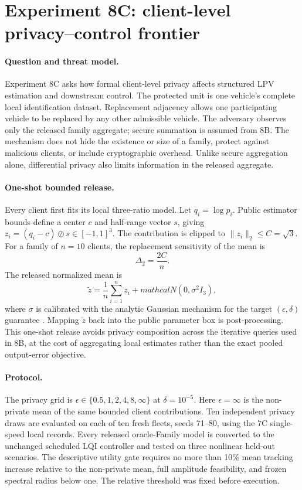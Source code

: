 \section{Experiment 8C: client-level privacy--control frontier}
\label{sec:experiment8c}

\paragraph{Question and threat model.}
Experiment 8C asks how formal client-level privacy affects structured LPV
estimation and downstream control. The protected unit is one vehicle's complete
local identification dataset. Replacement adjacency allows one participating
vehicle to be replaced by any other admissible vehicle. The adversary observes
only the released family aggregate; secure summation is assumed from 8B. The
mechanism does not hide the existence or size of a family, protect against
malicious clients, or include cryptographic overhead. Unlike secure aggregation
alone, differential privacy also limits information in the released aggregate.

\paragraph{One-shot bounded release.}
Every client first fits its local three-ratio model. Let $q_i=\log p_i$. Public
estimator bounds define a center $c$ and half-range vector $s$, giving
$z_i=(q_i-c)\oslash s\in[-1,1]^3$. The contribution is clipped to
$\lVert z_i\rVert_2\le C=\sqrt{3}$. For a family of $n=10$ clients, the
replacement sensitivity of the mean is
\begin{equation}
 \Delta_2=\frac{2C}{n}.
\end{equation}
The released normalized mean is
\begin{equation}
 \widetilde z=\frac1n\sum_{i=1}^n z_i+mathcal N(0,\sigma^2 I_3),
\end{equation}
where $\sigma$ is calibrated with the analytic Gaussian mechanism for the target
$(\epsilon,\delta)$ guarantee \cite{balle2018analytic}. Mapping $\widetilde z$
back into the public parameter box is post-processing. This one-shot release
avoids privacy composition across the iterative queries used in 8B, at the cost
of aggregating local estimates rather than the exact pooled output-error
objective.

\paragraph{Protocol.}
The privacy grid is $\epsilon\in\{0.5,1,2,4,8,\infty\}$ at
$\delta=10^{-5}$. Here $\epsilon=\infty$ is the non-private mean of the same
bounded client contributions. Ten independent privacy draws are evaluated on
each of ten fresh fleets, seeds 71--80, using the 7C single-speed local records.
Every released oracle-Family model is converted to the unchanged scheduled LQI
controller and tested on three nonlinear held-out scenarios. The descriptive
utility gate requires no more than 10\% mean tracking increase relative to the
non-private mean, full amplitude feasibility, and frozen spectral radius below
one. The relative threshold was fixed before execution.

